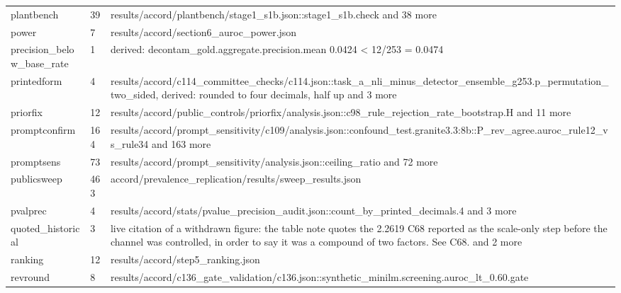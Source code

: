 \begin{longtable}{@{}p{1.6in}p{0.6in}p{3.6in}@{}}
plantbench & 39 & results/\allowbreak{}accord/\allowbreak{}plantbench/\allowbreak{}stage1\_s1b.\allowbreak{}json::stage1\_s1b.\allowbreak{}check and 38 more\\
power & 7 & results/\allowbreak{}accord/\allowbreak{}section6\_auroc\_power.\allowbreak{}json\\
precision\_below\_base\_rate & 1 & derived: decontam\_gold.\allowbreak{}aggregate.\allowbreak{}precision.\allowbreak{}mean 0.\allowbreak{}0424 < 12/\allowbreak{}253 = 0.\allowbreak{}0474\\
printedform & 4 & results/\allowbreak{}accord/\allowbreak{}c114\_committee\_checks/\allowbreak{}c114.\allowbreak{}json::task\_a\_nli\_minus\_detector\_ensemble\_g253.\allowbreak{}p\_permutation\_two\_sided, derived: rounded to four decimals, half up and 3 more\\
priorfix & 12 & results/\allowbreak{}accord/\allowbreak{}public\_controls/\allowbreak{}priorfix/\allowbreak{}analysis.\allowbreak{}json::c98\_rule\_rejection\_rate\_bootstrap.\allowbreak{}H and 11 more\\
promptconfirm & 164 & results/\allowbreak{}accord/\allowbreak{}prompt\_sensitivity/\allowbreak{}c109/\allowbreak{}analysis.\allowbreak{}json::confound\_test.\allowbreak{}granite3.\allowbreak{}3:8b::P\_rev\_agree.\allowbreak{}auroc\_rule12\_vs\_rule34 and 163 more\\
promptsens & 73 & results/\allowbreak{}accord/\allowbreak{}prompt\_sensitivity/\allowbreak{}analysis.\allowbreak{}json::ceiling\_ratio and 72 more\\
publicsweep & 463 & accord/\allowbreak{}prevalence\_replication/\allowbreak{}results/\allowbreak{}sweep\_results.\allowbreak{}json\\
pvalprec & 4 & results/\allowbreak{}accord/\allowbreak{}stats/\allowbreak{}pvalue\_precision\_audit.\allowbreak{}json::count\_by\_printed\_decimals.\allowbreak{}4 and 3 more\\
quoted\_historical & 3 & live citation of a withdrawn figure: the table note quotes the 2.\allowbreak{}2619 C68 reported as the scale-only step before the channel was controlled, in order to say it was a compound of two factors.\allowbreak{} See C68.\allowbreak{} and 2 more\\
ranking & 12 & results/\allowbreak{}accord/\allowbreak{}step5\_ranking.\allowbreak{}json\\
revround & 8 & results/\allowbreak{}accord/\allowbreak{}c136\_gate\_validation/\allowbreak{}c136.\allowbreak{}json::synthetic\_minilm.\allowbreak{}screening.\allowbreak{}auroc\_lt\_0.\allowbreak{}60.\allowbreak{}gate\\

\end{longtable}
